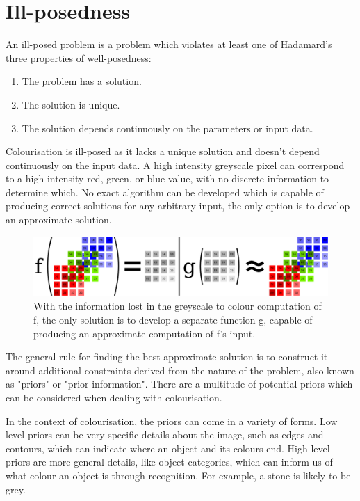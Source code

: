 \documentclass{l4proj}
\begin{document}

\section{Ill-posedness}
An ill-posed problem is a problem which violates at least one of Hadamard's three properties of well-posedness\cite{Hadamard}:
\begin{enumerate}
    \item The problem has a solution.
    \item The solution is unique.
    \item The solution depends continuously on the parameters or input data.
\end{enumerate}
Colourisation is ill-posed as it lacks a unique solution and doesn't depend continuously on the input data. A high intensity greyscale pixel can correspond to a high intensity red, green, or blue value, with no discrete information to determine which. No exact algorithm can be developed which is capable of producing correct solutions for any arbitrary input, the only option is to develop an approximate solution.
\begin{figure}[H]
    \centering
    \includegraphics[width=1.0\linewidth]{images/FunctionsHorizontal.png}    

    \caption{With the information lost in the greyscale to colour computation of f, the only solution is to develop a separate function g, capable of producing an approximate computation of f's input.}

    \label{fig:functions} 
\end{figure}

The general rule for finding the best approximate solution is to construct it around additional constraints derived from the nature of the problem, also known as "priors" or "prior information"\cite{Inverses}. There are a multitude of potential priors which can be considered when dealing with colourisation. 

In the context of colourisation, the priors can come in a variety of forms. Low level priors can be very specific details about the image, such as edges and contours, which can indicate where an object and its colours end. High level priors are more general details, like object categories, which can inform us of what colour an object is through recognition. For example, a stone is likely to be grey.
\end{document}
